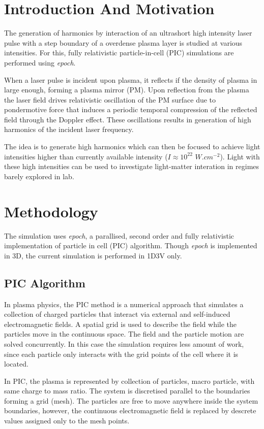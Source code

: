 \documentclass[12pt]{article}
\begin{document}
\section{Introduction And Motivation}
The generation of harmonics by interaction of an ultrashort high intensity laser pulse with a step boundary of a overdense plasma layer is studied at various intensities. For this, fully relativistic particle-in-cell (PIC) simulations are performed using \textit{epoch}.

When a laser pulse is incident upon plasma, it reflects if the density of plasma in large enough, forming a plasma mirror (PM). Upon reflection from the plasma the laser field drives relativistic oscillation of the PM surface due to pondermotive force that induces a periodic temporal compression of the reflected field through the Doppler effect. These oscillations results in generation of high harmonics of the incident laser frequency.

The idea is to generate high harmonics which can then be focused to achieve light intensities higher than currently available intensity ($I \approx 10^{22}$ $W.cm^{-2}$). Light with these high intensities can be used to investigate light-matter interation in regimes barely explored in lab.


\section{Methodology}
The simulation uses \textit{epoch}, a parallised, second order and fully relativistic implementation of particle in cell (PIC) algorithm. Though \textit{epoch} is implemented in 3D, the current simulation is performed in 1D3V only.
\subsection{PIC Algorithm}
In plasma physics, the PIC method is a numerical approach that simulates a collection
of charged particles that interact via external and self-induced electromagnetic fields. A
spatial grid is used to describe the field while the particles move in the continuous space. The field and the particle motion are solved concurrently. In this case the simulation
requires less amount of work, since each particle only interacts with the grid points of
the cell where it is located.

In PIC, the plasma is represented by collection of particles, macro particle, with same charge to mass ratio. The system is discretised parallel to the boundaries forming a grid (mesh). The particles are free to move anywhere inside the system boundaries, however, the continuous electromagnetic field is replaced by descrete values assigned only to the mesh points.
\end{document}
